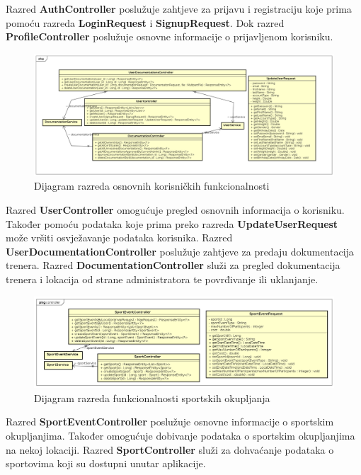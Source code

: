 		Razred \textbf{AuthController} poslužuje zahtjeve za prijavu i registraciju koje prima pomoću razreda \textbf{LoginRequest} i \textbf{SignupRequest}. Dok razred \textbf{ProfileController} poslužuje osnovne informacije o prijavljenom korisniku.
		
		
		\begin{figure}[H]
			\includegraphics[width=\textwidth]{dijagrami/dijagram_razreda_user.png}
			\caption{Dijagram razreda osnovnih korisničkih funkcionalnosti}
		\end{figure}
		Razred \textbf{UserController} omogućuje pregled osnovnih informacija o korisniku. Također pomoću podataka koje prima preko razreda \textbf{UpdateUserRequest} može vršiti osvježavanje podataka korisnika. Razred \textbf{UserDocumentationController} poslužuje zahtjeve za predaju dokumentacija trenera. Razred \textbf{DocumentationController} služi za pregled dokumentacija trenera i lokacija od strane administratora te povrđivanje ili uklanjanje. 
		
	
	
		\begin{figure}[H]
			\includegraphics[width=\textwidth]{dijagrami/dijagram_razreda_sportevente.png}
			\caption{Dijagram razreda funkcionalnosti sportskih okupljanja}
		\end{figure}
	
		Razred \textbf{SportEventController} poslužuje osnovne informacije o sportskim okupljanjima. Također omogućuje dobivanje podataka o sportskim okupljanjima na nekoj lokaciji. Razred \textbf{SportController} služi za dohvaćanje podataka o sportovima koji su dostupni unutar aplikacije.
	
